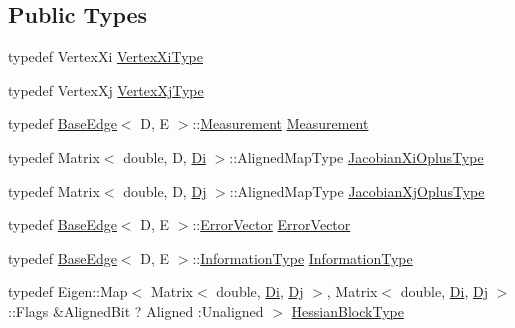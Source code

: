 \subsection*{Public Types}
\begin{DoxyCompactItemize}
\item 
typedef Vertex\+Xi \mbox{\hyperlink{classg2o_1_1_base_binary_edge_aa8e2b04b2c0c90adc48384d6d41063cc}{Vertex\+Xi\+Type}}
\item 
typedef Vertex\+Xj \mbox{\hyperlink{classg2o_1_1_base_binary_edge_aa489ae37680c37d7b2c3c1a197f90de9}{Vertex\+Xj\+Type}}
\item 
typedef \mbox{\hyperlink{classg2o_1_1_base_edge}{Base\+Edge}}$<$ D, E $>$\+::\mbox{\hyperlink{classg2o_1_1_base_binary_edge_ac1e9249e9906747a6669a9c90013944b}{Measurement}} \mbox{\hyperlink{classg2o_1_1_base_binary_edge_ac1e9249e9906747a6669a9c90013944b}{Measurement}}
\item 
typedef Matrix$<$ double, D, \mbox{\hyperlink{classg2o_1_1_base_binary_edge_abfe232196405a7204bc299a747c1cc8b}{Di}} $>$\+::Aligned\+Map\+Type \mbox{\hyperlink{classg2o_1_1_base_binary_edge_ab1cde84224b129603bcd95db027e0167}{Jacobian\+Xi\+Oplus\+Type}}
\item 
typedef Matrix$<$ double, D, \mbox{\hyperlink{classg2o_1_1_base_binary_edge_ab718b94950a34d589371fe6f5583b259}{Dj}} $>$\+::Aligned\+Map\+Type \mbox{\hyperlink{classg2o_1_1_base_binary_edge_a83e5dec2135b33e86255c87be3b5d062}{Jacobian\+Xj\+Oplus\+Type}}
\item 
typedef \mbox{\hyperlink{classg2o_1_1_base_edge}{Base\+Edge}}$<$ D, E $>$\+::\mbox{\hyperlink{classg2o_1_1_base_binary_edge_ae1cccf6068b2446ece316b6a69a46acf}{Error\+Vector}} \mbox{\hyperlink{classg2o_1_1_base_binary_edge_ae1cccf6068b2446ece316b6a69a46acf}{Error\+Vector}}
\item 
typedef \mbox{\hyperlink{classg2o_1_1_base_edge}{Base\+Edge}}$<$ D, E $>$\+::\mbox{\hyperlink{classg2o_1_1_base_binary_edge_a4530ef6462aadaf2ab826d440d3b3318}{Information\+Type}} \mbox{\hyperlink{classg2o_1_1_base_binary_edge_a4530ef6462aadaf2ab826d440d3b3318}{Information\+Type}}
\item 
typedef Eigen\+::\+Map$<$ Matrix$<$ double, \mbox{\hyperlink{classg2o_1_1_base_binary_edge_abfe232196405a7204bc299a747c1cc8b}{Di}}, \mbox{\hyperlink{classg2o_1_1_base_binary_edge_ab718b94950a34d589371fe6f5583b259}{Dj}} $>$, Matrix$<$ double, \mbox{\hyperlink{classg2o_1_1_base_binary_edge_abfe232196405a7204bc299a747c1cc8b}{Di}}, \mbox{\hyperlink{classg2o_1_1_base_binary_edge_ab718b94950a34d589371fe6f5583b259}{Dj}} $>$\+::Flags \&Aligned\+Bit ? Aligned \+:Unaligned $>$ \mbox{\hyperlink{classg2o_1_1_base_binary_edge_a7eadbbe6abffe4d2ebdf6231272789a5}{Hessian\+Block\+Type}}

\end{DoxyCompactItemize}
